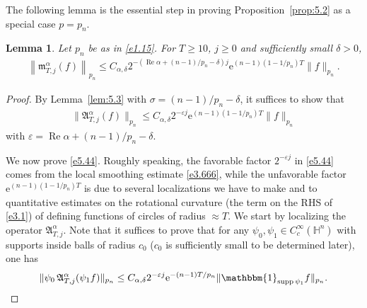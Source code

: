 \documentclass[11pt]{amsproc}
\newcommand{\e}{\mathrm{e}}
\newcommand{\indicator}{\mathbbm{1}}
\newcommand{\supp}{\mathop{\mathrm{supp}}}
\newcommand{\fm}{\mathfrak{m}}
\newcommand{\0}{\mathbf{0}}
\renewcommand{\Re}{\mathop{\mathrm{Re}}}
\renewcommand{\H}{\mathbb{H}}
\numberwithin{equation}{section}
\numberwithin{figure}{section}
\newtheorem{lem}[thm]{Lemma}
\theoremstyle{definition}
\theoremstyle{remark}
\numberwithin{thm}{section}
\begin{document}
The following lemma is the  essential step in proving Proposition~\ref{prop:5.2}
as a special case  $p=  p_n.$



\begin{lem}\label{lem:5.6}
Let $p_n$ be as in \eqref{e1.15}.
For $T\geq 10$, $j\geq 0$ and sufficiently small $\delta>0$,
\begin{eqnarray}\label{e5.4}
\left\|\fm^\alpha_{T,j}(f)\right\|_{p_n}\leq C_{\alpha,\delta} 2^{-(\Re \alpha+(n-1)/p_n-\delta)j}\e^{(n-1)(1-1/p_n)T}\|f\|_{p_n}.
\end{eqnarray}
\end{lem}


\begin{proof}
By Lemma~\ref{lem:5.3} with $\sigma=(n-1)/p_n-\delta$, it suffices to show that
\begin{eqnarray}\label{e5.44}
\|{\mathfrak A}^\alpha_{T,j}(f)\|_{p_n}\leq C_{\alpha,\delta} 2^{-\varepsilon j}\e^{(n-1)(1-1/p_n)T}\|f\|_{p_n}
\end{eqnarray}
with  $\varepsilon=\Re\alpha+(n-1)/p_n-\delta$.

We now prove \eqref{e5.44}.
Roughly speaking, the favorable factor $2^{-\varepsilon j}$ in \eqref{e5.44} comes from the local smoothing estimate \eqref{e3.666}, while the unfavorable factor $\e^{(n-1)(1-1/p_n)T}$ is due to several localizations we have to make and to quantitative estimates on the   rotational curvature (the term on the RHS of \eqref{e3.1}) of defining functions of circles of radius $\approx T$.
We start by localizing the operator ${\mathfrak A}^\alpha_{T,j}$. Note that it suffices to prove that for any $\psi_0,\psi_1\in C_c^\infty(\H^n)$ with supports inside balls of radius $c_0$ ($c_0$ is sufficiently small to be determined later), one has
\begin{eqnarray}\label{e5.6}
\|\psi_0\,{\mathfrak A}^\alpha_{T,j}(\psi_1f)\|_{p_n}\leq C_{\alpha,\delta} 2^{-\varepsilon j}\e^{-(n-1)T/p_n}\|\indicator_{\supp \psi_1}f\|_{p_n}.
\end{eqnarray}


\end{proof}
\end{document}

